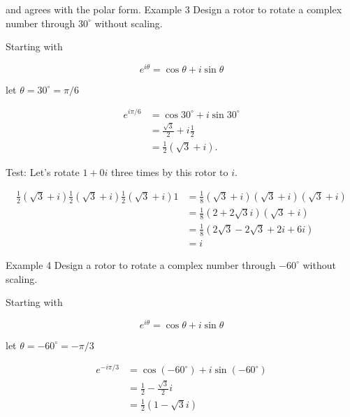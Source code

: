 and agrees with the polar form. Example 3 Design a rotor to rotate a complex number through $30^{\circ}$ without scaling.

Starting with

$$
e^{i \theta}=\cos \theta+i \sin \theta
$$

let $\theta=30^{\circ}=\pi / 6$

$$
\begin{aligned}
e^{i \pi / 6} & =\cos 30^{\circ}+i \sin 30^{\circ} \\
& =\frac{\sqrt{3}}{2}+i \frac{1}{2} \\
& =\frac{1}{2}(\sqrt{3}+i) .
\end{aligned}
$$

Test: Let's rotate $1+0 i$ three times by this rotor to $i$.

$$
\begin{aligned}
\frac{1}{2}(\sqrt{3}+i) \frac{1}{2}(\sqrt{3}+i) \frac{1}{2}(\sqrt{3}+i) 1 & =\frac{1}{8}(\sqrt{3}+i)(\sqrt{3}+i)(\sqrt{3}+i) \\
& =\frac{1}{8}(2+2 \sqrt{3} i)(\sqrt{3}+i) \\
& =\frac{1}{8}(2 \sqrt{3}-2 \sqrt{3}+2 i+6 i) \\
& =i
\end{aligned}
$$

Example 4 Design a rotor to rotate a complex number through $-60^{\circ}$ without scaling.

Starting with

$$
e^{i \theta}=\cos \theta+i \sin \theta
$$

let $\theta=-60^{\circ}=-\pi / 3$

$$
\begin{aligned}
e^{-i \pi / 3} & =\cos \left(-60^{\circ}\right)+i \sin \left(-60^{\circ}\right) \\
& =\frac{1}{2}-\frac{\sqrt{3}}{2} i \\
& =\frac{1}{2}(1-\sqrt{3} i)
\end{aligned}
$$
